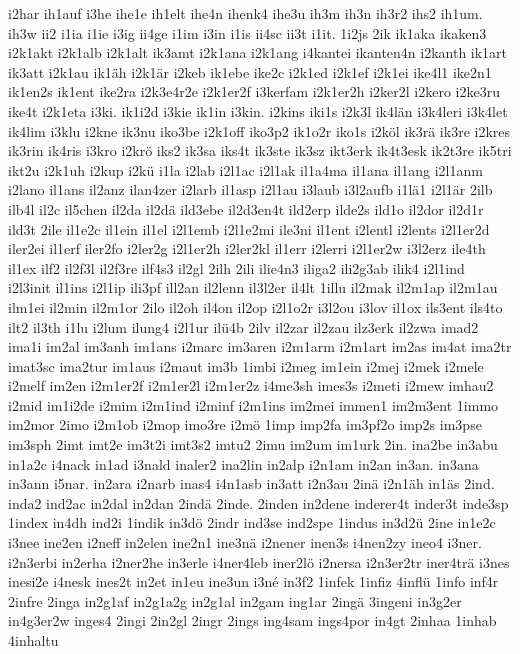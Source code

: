 {i2har
ih1auf
i3he
ihe1e
ih1elt
ihe4n
ihenk4
ihe3u
ih3m
ih3n
ih3r2
ihs2
ih1um.
ih3w
ii2
i1ia
i1ie
i3ig
ii4ge
i1im
i3in
i1is
ii4sc
ii3t
i1it.
1i2js
2ik
ik1aka
ikaken3
i2k1akt
i2k1alb
i2k1alt
ik3amt
i2k1ana
i2k1ang
i4kantei
ikanten4n
i2kanth
ik1art
ik3att
i2k1au
ik1äh
i2k1är
i2keb
ik1ebe
ike2c
i2k1ed
i2k1ef
i2k1ei
ike4l1
ike2n1
ik1en2s
ik1ent
ike2ra
i2k3e4r2e
i2k1er2f
i3kerfam
i2k1er2h
i2ker2l
i2kero
i2ke3ru
ike4t
i2k1eta
i3ki.
ik1i2d
i3kie
ik1in
i3kin.
i2kins
iki1s
i2k3l
ik4län
i3k4leri
i3k4let
ik4lim
i3klu
i2kne
ik3nu
iko3be
i2k1off
iko3p2
ik1o2r
iko1s
i2köl
ik3rä
ik3re
i2kres
ik3rin
ik4ris
i3kro
i2krö
iks2
ik3sa
iks4t
ik3ste
ik3sz
ikt3erk
ik4t3esk
ik2t3re
ik5tri
ikt2u
i2k1uh
i2kup
i2kü
i1la
i2lab
i2l1ac
i2l1ak
il1a4ma
il1ana
il1ang
i2l1anm
i2lano
il1ans
il2anz
ilan4zer
i2larb
il1asp
i2l1au
i3laub
i3l2aufb
i1lä1
i2l1är
2ilb
ilb4l
il2c
il5chen
il2da
il2dä
ild3ebe
il2d3en4t
ild2erp
ilde2s
ild1o
il2dor
il2d1r
ild3t
2ile
il1e2c
il1ein
il1el
i2l1emb
i2l1e2mi
ile3ni
il1ent
i2lentl
i2lents
i2l1er2d
iler2ei
il1erf
iler2fo
i2ler2g
i2l1er2h
i2ler2kl
il1err
i2lerri
i2l1er2w
i3l2erz
ile4th
il1ex
ilf2
il2f3l
il2f3re
ilf4s3
il2gl
2ilh
2ili
ilie4n3
iliga2
ili2g3ab
ilik4
i2l1ind
i2l3init
il1ins
i2l1ip
ili3pf
ill2an
il2lenn
il3l2er
il4lt
1illu
il2mak
il2m1ap
il2m1au
ilm1ei
il2min
il2m1or
2ilo
il2oh
il4on
il2op
i2l1o2r
i3l2ou
i3lov
il1ox
ils3ent
ils4to
ilt2
il3th
i1lu
i2lum
ilung4
i2l1ur
ilü4b
2ilv
il2zar
il2zau
ilz3erk
il2zwa
imad2
ima1i
im2al
im3anh
im1ans
i2marc
im3aren
i2m1arm
i2m1art
im2as
im4at
ima2tr
imat3sc
ima2tur
im1aus
i2maut
im3b
1imbi
i2meg
im1ein
i2mej
i2mek
i2mele
i2melf
im2en
i2m1er2f
i2m1er2l
i2m1er2z
i4me3sh
imes3s
i2meti
i2mew
imhau2
i2mid
im1i2de
i2mim
i2m1ind
i2minf
i2m1ins
im2mei
immen1
im2m3ent
1immo
im2mor
2imo
i2m1ob
i2mop
imo3re
i2mö
1imp
imp2fa
im3pf2o
imp2s
im3pse
im3sph
2imt
imt2e
im3t2i
imt3s2
imtu2
2imu
im2um
im1urk
2in.
ina2be
in3abu
in1a2c
i4nack
in1ad
i3nald
inaler2
ina2lin
in2alp
i2n1am
in2an
in3an.
in3ana
in3ann
i5nar.
in2ara
i2narb
inas4
i4n1asb
in3att
i2n3au
2inä
i2n1äh
in1äs
2ind.
inda2
ind2ac
in2dal
in2dan
2indä
2inde.
2inden
in2dene
inderer4t
inder3t
inde3sp
1index
in4dh
ind2i
1indik
in3dö
2indr
ind3se
ind2spe
1indus
in3d2ü
2ine
in1e2c
i3nee
ine2en
i2neff
in2elen
ine2n1
ine3nä
i2nener
inen3s
i4nen2zy
ineo4
i3ner.
i2n3erbi
in2erha
i2ner2he
in3erle
i4ner4leb
iner2lö
i2nersa
i2n3er2tr
iner4trä
i3nes
inesi2e
i4nesk
ines2t
in2et
in1eu
ine3un
i3né
in3f2
1infek
1infiz
4inflü
1info
inf4r
2infre
2inga
in2g1af
in2g1a2g
in2g1al
in2gam
ing1ar
2ingä
3ingeni
in3g2er
in4g3er2w
inges4
2ingi
2in2gl
2ingr
2ings
ing4sam
ings4por
in4gt
2inhaa
1inhab
4inhaltu
}
